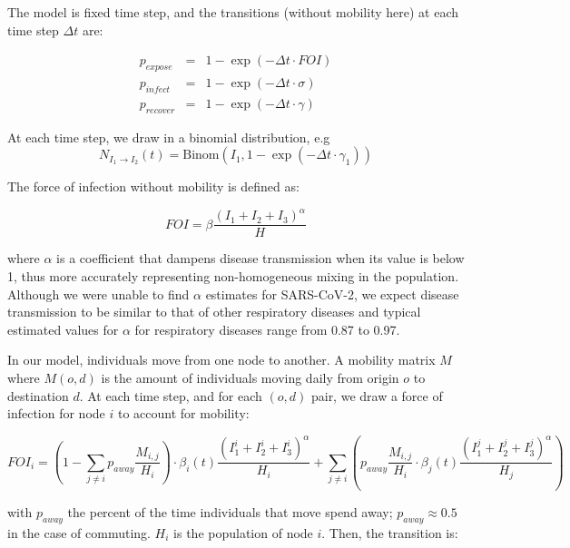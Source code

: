 The model is fixed time step, and the transitions (without mobility here) at each time step
$\Delta t$ are: 

\begin{eqnarray}
p_{expose} &=&  1 - \exp(-\Delta t \cdot FOI) \\
p_{infect} &=& 1 - \exp(-\Delta t \cdot \sigma)\\
p_{recover} &=& 1 - \exp(-\Delta t \cdot \gamma)
\end{eqnarray}

At each time step, we draw in a binomial distribution, e.g 
\begin{equation}
N_{I_1\longrightarrow I_2}(t) = \text{Binom}(I_1, 1 - \exp(-\Delta t \cdot \gamma_1))
\end{equation}

The force of infection without mobility is defined as: 

\begin{equation}
FOI = \beta \frac{(I_1 + I_2 + I_3)^\alpha}{H} 
\end{equation}

where $\alpha$ is a coefficient that dampens disease transmission when its value is below 1, thus more accurately representing non-homogeneous mixing in the population. Although we were unable to find $\alpha$ estimates for SARS-CoV-2, we expect disease transmission to be similar to that of other respiratory diseases and typical estimated values for $\alpha$ for respiratory diseases range from 0.87 to 0.97.

In our model, individuals move from one node to another. A mobility matrix $M$ where
$M(o,d)$ is the amount of individuals moving daily from origin $o$ to
destination $d$. At each time step, and for each $(o,d)$ pair, we draw a force of infection 
for node $i$ to account for mobility:
\begin{fullwidth}
	
\begin{equation}
FOI_i = \left(1 - \sum_{j\neq i} p_{away} \frac{M_{i,j}}{H_i} \right) \cdot \beta_i(t) \frac{(I_1^{i} + I_2^{i} + I_3^{i})^\alpha}{H_i} +  \sum_{j \neq i} \left(p_{away} \frac{M_{i,j}}{H_i} \cdot \beta_j(t) \frac{(I_1^j + I_2^j + I_3^j)^\alpha}{H_j} \right)
\end{equation}
\end{fullwidth}

with $p_{away}$ the percent of the time individuals that move spend away; $p_{away} \approx 0.5$ in the case of commuting. $H_i$ is the population of node $i$. Then, the transition is:

